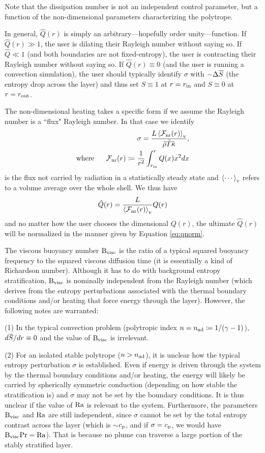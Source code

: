 \documentclass[12pt]{article}
\numberwithin{equation}{section}
\newcommand{\nad}{n_{\rm{ad}}}
\begin{document}
Note that the dissipation number is not an independent control parameter, but a function of the non-dimensional parameters characterizing the polytrope. 

In general, $\hat{Q}(r)$ is simply an arbitrary---hopefully order unity---function. If $\hat{Q}(r)\gg1$, the user is dilating their Rayleigh number without saying so. If $\hat{Q}\ll1$ (and both boundaries are not fixed-entropy), the user is contracting their Rayleigh number without saying so. If $\hat{Q}(r)\equiv0$ (and the user is running a convection simulation), the user should typically identify $\sigma$ with $-\Delta\overline{S}$ (the entropy drop across the layer) and thus set $S\equiv1$ at $r=r_{\rm{in}}$ and $S\equiv0$ at $r=r_{\rm{out}}$.
 
The non-dimensional heating takes a specific form if we assume the Rayleigh number is a ``flux" Rayleigh number. In that case we identify
\begin{align}
	\sigma = \frac{L \left\langle{\mathcal{F}}_{\rm{nr}}(r)\right\rangle_{\rm{v}}}{\tilde{\rho}\tilde{T}\tilde{\kappa}},\\
	\text{where}\ \ \ \ \  {\mathcal{F}}_{\rm{nr}}(r) \coloneqq \frac{1}{r^2}\int_{r_{\rm{in}}}^r Q(x) x^2 dx
\end{align}
is the flux not carried by radiation in a statistically steady state and $\left\langle\cdots\right\rangle_{\rm{v}}$ refers to a volume average over the whole shell. We thus have
\begin{align}\label{eq:qnorm}
	\hat{Q}(r) = \frac{L}{\left\langle{\mathcal{F}}_{\rm{nr}}(r)\right\rangle_{\rm{v}}}Q(r)
\end{align}
and no matter how the user chooses the dimensional $Q(r)$, the ultimate $\hat{Q}(r)$ will be normalized in the manner given by Equation \eqref{eq:qnorm}. 

The viscous buoyancy number ${\rm{B_{visc}}}$ is the ratio of a typical squared buoyancy frequency to the squared viscous diffusion time (it is essentially a kind of Richardson number). Although it has to do with background entropy stratification, ${\rm{B_{visc}}}$ is nominally independent from the Rayleigh number (which derives from the entropy perturbations associated with the thermal boundary conditions and/or heating that force energy through the layer). However, the following notes are warranted: 

(1) In the typical convection problem (polytropic index $n=\nad\define1/(\gamma-1)$), $d\overline{S}/dr\equiv0$ and the value of ${\rm{B_{visc}}}$ is irrelevant. 

(2) For an isolated stable polytrope ($n>\nad$), it is unclear how the typical entropy perturbation $\sigma$ is established. Even if energy is driven through the system by the thermal boundary conditions and/or heating, the energy will likely be carried by spherically symmetric conduction (depending on how stable the stratification is) and $\sigma$ may not be set by the boundary conditions. It is thus unclear if the value of ${\rm{Ra}}$ is relevant to the system. Furthermore, the parameters ${\rm{B_{visc}}}$ and ${\rm{Ra}}$ are still independent, since $\sigma$ cannot be set by the total entropy contrast across the layer (which is $\sim$$c_{\rm{p}}$, and if $\sigma=c_{\rm{p}}$, we would have ${\rm{B_{visc}}}{\rm{Pr}} = {\rm{Ra}}$). That is because no plume can traverse a large portion of the stably stratified layer. 
\end{document}
